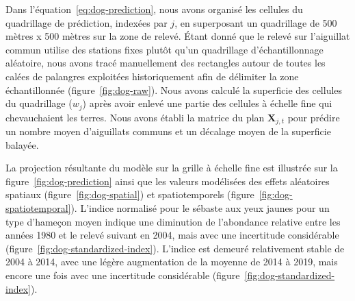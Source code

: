 \documentclass[french,11pt]{book}
\begin{document}
Dans l'équation~\ref{eq:dog-prediction}, nous avons organisé les cellules du quadrillage de prédiction, indexées par \(j\), en superposant un quadrillage de 500 mètres x 500 mètres sur la zone de relevé. Étant donné que le relevé sur l'aiguillat commun utilise des stations fixes plutôt qu'un quadrillage d'échantillonnage aléatoire, nous avons tracé manuellement des rectangles autour de toutes les calées de palangres exploitées historiquement afin de délimiter la zone échantillonnée (figure~\ref{fig:dog-raw}). Nous avons calculé la superficie des cellules du quadrillage (\(w_j\)) après avoir enlevé une partie des cellules à échelle fine qui chevauchaient les terres. Nous avons établi la matrice du plan \(\bm{X}_{j,t}\) pour prédire un nombre moyen d'aiguillats communs et un décalage moyen de la superficie balayée.

La projection résultante du modèle sur la grille à échelle fine est illustrée sur la figure~\ref{fig:dog-prediction} ainsi que les valeurs modélisées des effets aléatoires spatiaux (figure~\ref{fig:dog-spatial}) et spatiotemporels (figure~\ref{fig:dog-spatiotemporal}). L'indice normalisé pour le sébaste aux yeux jaunes pour un type d'hameçon moyen indique une diminution de l'abondance relative entre les années 1980 et le relevé suivant en 2004, mais avec une incertitude considérable (figure~\ref{fig:dog-standardized-index}). L'indice est demeuré relativement stable de 2004 à 2014, avec une légère augmentation de la moyenne de 2014 à 2019, mais encore une fois avec une incertitude considérable (figure~\ref{fig:dog-standardized-index}).
\end{document}
